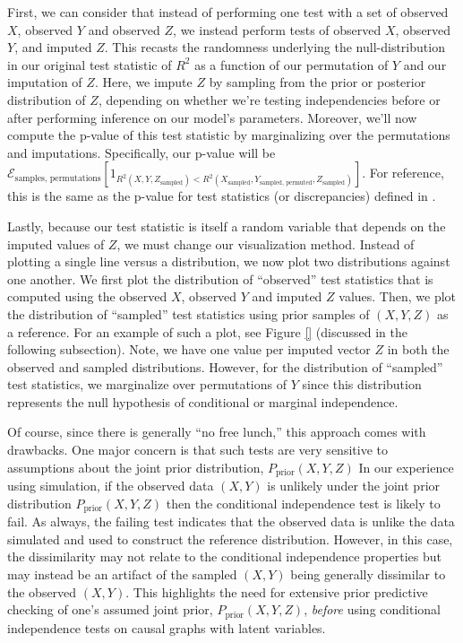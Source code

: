 First, we can consider that instead of performing one test with a set of observed $X$, observed $Y$ and observed $Z$, we instead perform tests of observed $X$, observed $Y$, and imputed $Z$.
This recasts the randomness underlying the null-distribution in our original test statistic of $R^2$ as a function of our permutation of $Y$ and our imputation of $Z$.
Here, we impute $Z$ by sampling from the prior or posterior distribution of $Z$, depending on whether we're testing independencies before or after performing inference on our model's parameters.
Moreover, we'll now compute the p-value of this test statistic by marginalizing over the permutations and imputations.
Specifically, our p-value will be $\mathcal{E}_{\textrm{samples, permutations}} \left[ 1_{R^2 \left( X, Y, Z_{\textrm{sampled}} \right) <  R^2 \left( X_{\textrm{sampled}}, Y_{\textrm{sampled, permuted}}, Z_{\textrm{sampled}} \right)} \right]$.
For reference, this is the same as the p-value for test statistics (or discrepancies) defined in \citet[Eq. 7]{gelman_1996_posterior}.

Lastly, because our test statistic is itself a random variable that depends on the imputed values of $Z$, we must change our visualization method.
Instead of plotting a single line versus a distribution, we now plot two distributions against one another.
We first plot the distribution of ``observed'' test statistics that is computed using the observed $X$, observed $Y$ and imputed $Z$ values.
Then, we plot the distribution of ``sampled'' test statistics using prior samples of $\left( X, Y, Z \right)$ as a reference.
For an example of such a plot, see Figure \ref{} (discussed in the following subsection).
Note, we have one value per imputed vector $Z$ in both the observed and sampled distributions.
However, for the distribution of ``sampled'' test statistics, we marginalize over permutations of $Y$ since this distribution represents the null hypothesis of conditional or marginal independence.

Of course, since there is generally ``no free lunch,'' this approach comes with drawbacks.
One major concern is that such tests are very sensitive to assumptions about the joint prior distribution, $P_{\textrm{prior}} \left( X, Y, Z \right)$
In our experience using simulation, if the observed data $\left( X, Y \right)$ is unlikely under the joint prior distribution $P_{\textrm{prior}} \left( X, Y, Z \right)$ then the conditional independence test is likely to fail.
As always, the failing test indicates that the observed data is unlike the data simulated and used to construct the reference distribution.
However, in this case, the dissimilarity may not relate to the conditional independence properties but may instead be an artifact of the sampled $\left( X, Y \right)$ being generally dissimilar to the observed $\left( X, Y \right)$.
This highlights the need for extensive prior predictive checking of one's assumed joint prior, $P_{\textrm{prior}} \left( X, Y, Z \right)$, \textit{before} using conditional independence tests on causal graphs with latent variables.

